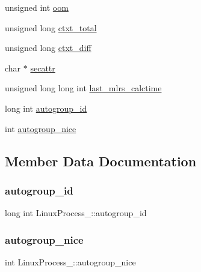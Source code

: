 \begin{DoxyCompactItemize}
\item 
unsigned int \hyperlink{structLinuxProcess___ac878657f2e7afac87448dfe39ca98815}{oom}
\item 
unsigned long \hyperlink{structLinuxProcess___a2e2394831c95d9170f4caa2b06821c86}{ctxt\+\_\+total}
\item 
unsigned long \hyperlink{structLinuxProcess___a1955a84febd02d179b8ba1bd2305a868}{ctxt\+\_\+diff}
\item 
char $\ast$ \hyperlink{structLinuxProcess___a720ed365fe67e8ba682fe58f085dd4dc}{secattr}
\item 
unsigned long long int \hyperlink{structLinuxProcess___a34976167e61397ba174427aca9f44b08}{last\+\_\+mlrs\+\_\+calctime}
\item 
long int \hyperlink{structLinuxProcess___ad5dc5ded6efd7a21cc206740bc1ba6e1}{autogroup\+\_\+id}
\item 
int \hyperlink{structLinuxProcess___a4563f6fb7eddbdd45c503e77b312804c}{autogroup\+\_\+nice}
\end{DoxyCompactItemize}


\subsection{Member Data Documentation}
\mbox{\label{structLinuxProcess___ad5dc5ded6efd7a21cc206740bc1ba6e1}} 
\subsubsection{\texorpdfstring{autogroup\+\_\+id}{autogroup\_id}}
{\footnotesize\ttfamily long int Linux\+Process\+\_\+\+::autogroup\+\_\+id}

\mbox{\label{structLinuxProcess___a4563f6fb7eddbdd45c503e77b312804c}} 
\subsubsection{\texorpdfstring{autogroup\+\_\+nice}{autogroup\_nice}}
{\footnotesize\ttfamily int Linux\+Process\+\_\+\+::autogroup\+\_\+nice}

